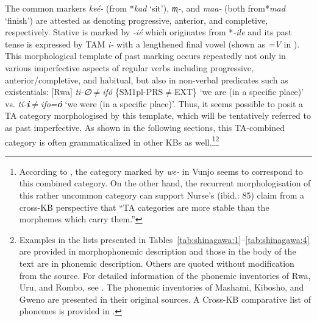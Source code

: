 \documentclass[output=paper]{langscibook}
\begin{document}
The common markers \textit{keé-} (from *\textit{kad} ‘sit’), \textit{m̩-}, and \textit{maa-} (both from{*\textit{mad} ‘finish’) are attested as denoting progressive, anterior, and completive, respectively. Stative is marked by \textit{{}-ié} which originates from *\textit{{}-ile} and its past tense is expressed by TAM \textit{i-} with a lengthened final vowel (shown as \textit{=V} in ). This morphological template of past marking occurs repeatedly not only in various imperfective aspects of regular verbs including progressive, anterior/completive, and habitual, but also in non-verbal predicates such as existentials: [Rwa]} \textit{ti-∅${\neq}$ifó} \{SM1pl-PRS${\neq}$EXT\} `we are (in a specific place)' vs. \textit{tí-}\textbf{\textit{i}}\textit{${\neq}$ifo=}\textbf{\textit{ó}} `we were (in a specific place)'. {Thus, it seems possible to posit a TA category morphologised by this template, which will be tentatively referred to as past imperfective. As shown in the following sections, this TA-combined category is often grammaticalized in other KBs as well}.\footnote{According to \citet[77]{Nurse2003a}, the category marked by \textit{we-} in Vunjo seems to correspond to this combined category. On the other hand, the recurrent morphologisation of this rather uncommon category can support Nurse’s (ibid.: 85) claim from a cross-KB perspective that “TA categories are more stable than the morphemes which carry them.”}\footnote{Examples in the lists presented in Tables~\ref{tab:shinagawa:1}--\ref{tab:shinagawa:4} are provided in morphophonemic description and those in the body of the text are in phonemic description. Others are quoted without modification from the source. For detailed information of the phonemic inventories of Rwa, Uru, and Rombo, see \citet{ShinagawaForthcoming-a}. The phonemic inventories of Mashami, Kibosho, and Gweno are presented in their original sources. A Cross-KB comparative list of phonemes is provided in \citet{PhilippsonMontlahuc2003}.}
\end{document}

